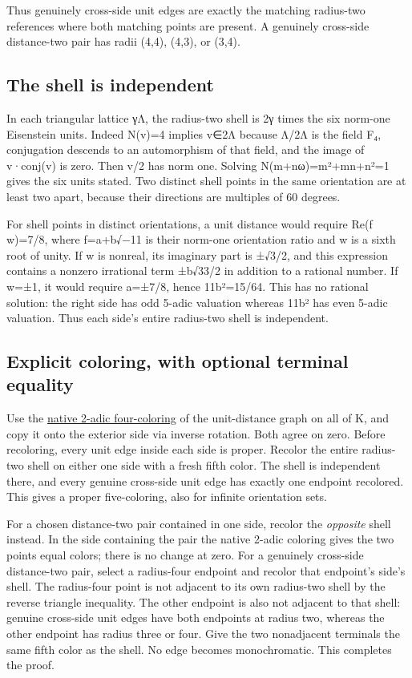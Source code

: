 \documentclass[
  11pt,
]{article}
\begin{document}
Thus genuinely cross-side unit edges are exactly the matching radius-two
references where both matching points are present. A genuinely
cross-side distance-two pair has radii (4,4), (4,3), or (3,4).

\subsection{The shell is independent}\label{the-shell-is-independent}

In each triangular lattice γΛ, the radius-two shell is 2γ times the six
norm-one Eisenstein units. Indeed N(v)=4 implies v∈2Λ because Λ/2Λ is
the field F₄, conjugation descends to an automorphism of that field, and
the image of v·conj(v) is zero. Then v/2 has norm one. Solving
N(m+nω)=m²+mn+n²=1 gives the six units stated. Two distinct shell points
in the same orientation are at least two apart, because their directions
are multiples of 60 degrees.

For shell points in distinct orientations, a unit distance would require
Re(f w)=7/8, where f=a+b√−11 is their norm-one orientation ratio and w
is a sixth root of unity. If w is nonreal, its imaginary part is ±√3/2,
and this expression contains a nonzero irrational term ±b√33/2 in
addition to a rational number. If w=±1, it would require a=±7/8, hence
11b²=15/64. This has no rational solution: the right side has odd 5-adic
valuation whereas 11b² has even 5-adic valuation. Thus each side's
entire radius-two shell is independent.

\subsection{Explicit coloring, with optional terminal
equality}\label{explicit-coloring-with-optional-terminal-equality}

Use the
\href{https://github.com/Aafimalek/novel-discoveries/tree/b2f2d863aa4903b8aee52efc006e26f3c8b738b8/hadwiger-nelson/verification/parts-native-field-obstruction}{native
2-adic four-coloring} of the unit-distance graph on all of K, and copy
it onto the exterior side via inverse rotation. Both agree on zero.
Before recoloring, every unit edge inside each side is proper. Recolor
the entire radius-two shell on either one side with a fresh fifth color.
The shell is independent there, and every genuine cross-side unit edge
has exactly one endpoint recolored. This gives a proper five-coloring,
also for infinite orientation sets.

For a chosen distance-two pair contained in one side, recolor the
\emph{opposite} shell instead. In the side containing the pair the
native 2-adic coloring gives the two points equal colors; there is no
change at zero. For a genuinely cross-side distance-two pair, select a
radius-four endpoint and recolor that endpoint's side's shell. The
radius-four point is not adjacent to its own radius-two shell by the
reverse triangle inequality. The other endpoint is also not adjacent to
that shell: genuine cross-side unit edges have both endpoints at radius
two, whereas the other endpoint has radius three or four. Give the two
nonadjacent terminals the same fifth color as the shell. No edge becomes
monochromatic. This completes the proof.
\end{document}
